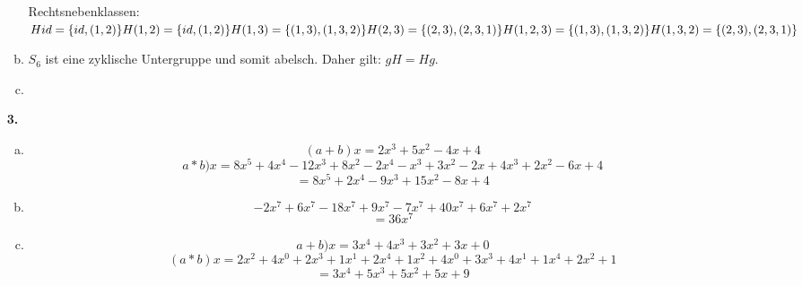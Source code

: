 \documentclass[a4paper]{scrartcl}
\begin{document}
\begin{enumerate}
\begin{enumerate}[a)]
Rechtsnebenklassen:\\
$Hid = \{ id , (1,2) \} \\
H(1,2) = \{ id , (1,2) \} \\
H(1,3) = \{ (1,3) , (1,3,2) \} \\
H(2,3) = \{ (2,3) , (2,3,1) \} \\
H(1,2,3) = \{ (1,3) , (1,3,2) \} \\
H(1,3,2) = \{ (2,3) , (2,3,1) \} $
\item
$S_6$ ist eine zyklische Untergruppe und somit abelsch. Daher gilt: 
$gH = Hg$.
\item 
\end{enumerate}
\item[\textbf{3.}]
\begin{enumerate}[a)]
\item
\[(a+b)x = 2x^3+5x^2-4x+4\]
\[a*b)x = 8x^5+4x^4-12x^3+8x^2-2x^4-x^3+3x^2-2x+4x^3+2x^2-6x+4\]
\[=8x^5+2x^4-9x^3+15x^2-8x+4\]
\item
\[-2x^7+6x^7-18x^7+9x^7-7x^7+40x^7+6x^7+2x^7\]
\[=36x^7\]
\item
\[a+b)x = 3x^4+4x^3+3x^2+3x+0\]
\[(a*b)x = 2x^2+4x^0+2x^3+1x^1+2x^4+1x^2+4x^0+3x^3+4x^1+1x^4+2x^2+1\]
\[=3x^4+5x^3+5x^2+5x+9\]
\end{enumerate}
\end{enumerate}
\end{document}
